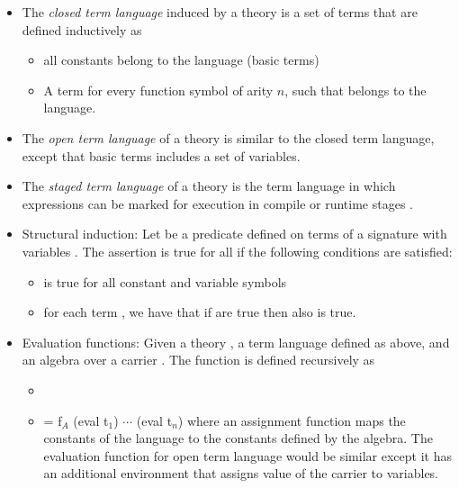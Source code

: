 \begin{itemize}
    \item The \emph{closed term language} induced by a theory is a set of terms that are defined inductively as 
    \begin{itemize}
        \item all constants belong to the language (basic terms) 
        \item A term  for every function symbol  of arity $n$, such that   belongs to the language. 
    \end{itemize}
    \item The \emph{open term language} of a theory is similar to the closed term language, except that basic terms includes a set of variables.  
    \item The \emph{staged term language} of a theory is the term language in which expressions can be marked for execution in compile or runtime stages .  
    \item Structural induction: Let  be a predicate defined on terms  of a signature  with variables . The assertion  is true for all  if the following conditions are satisfied: 
    \begin{itemize}
        \item {} is true for all constant and variable symbols 
        \item for each term , we have that if  are true then also  is true.  
    \end{itemize}     
    \item Evaluation functions: Given a theory , a term language defined as above, and an algebra over a carrier . The function  is defined recursively as 
    \begin{itemize}
        \item {}
        \item {} = f$_A$ (eval t$_1$) $\cdots$ (eval t$_n$) where an assignment function maps the constants of the language to the constants defined by the algebra. The evaluation function for open term language would be similar except it has an additional environment that assigns value of the carrier to variables. 

\end{itemize}
\end{itemize}
